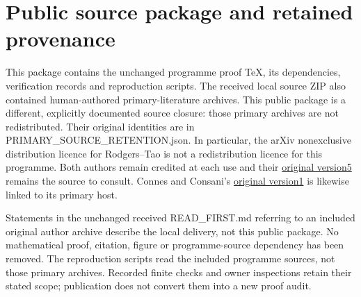 \documentclass[
]{article}
\author{}
\date{}
\begin{document}
\section{Public source package and retained
provenance}\label{public-source-package-and-retained-provenance}

This package contains the unchanged programme proof TeX, its
dependencies, verification records and reproduction scripts. The
received local source ZIP also contained human-authored
primary-literature archives. This public package is a different,
explicitly documented source closure: those primary archives are not
redistributed. Their original identities are in
PRIMARY\_SOURCE\_RETENTION.json. In particular, the arXiv nonexclusive
distribution licence for Rodgers--Tao is not a redistribution licence
for this programme. Both authors remain credited at each use and their
\href{https://arxiv.org/abs/1801.05914v5}{original version5} remains the
source to consult. Connes and Consani's
\href{https://arxiv.org/abs/2501.06560v1}{original version1} is likewise
linked to its primary host.

Statements in the unchanged received READ\_FIRST.md referring to an
included original author archive describe the local delivery, not this
public package. No mathematical proof, citation, figure or
programme-source dependency has been removed. The reproduction scripts
read the included programme sources, not those primary archives.
Recorded finite checks and owner inspections retain their stated scope;
publication does not convert them into a new proof audit.
\end{document}
